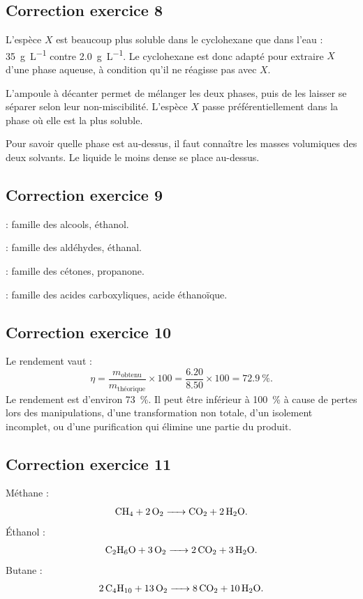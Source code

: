 \documentclass[11pt,a4paper]{article}
\begin{document}
\subsection*{Correction exercice 8}
\begin{correctionbox}
L'espèce $X$ est beaucoup plus soluble dans le cyclohexane que dans l'eau : \SI{35}{g.L^{-1}} contre \SI{2.0}{g.L^{-1}}. Le cyclohexane est donc adapté pour extraire $X$ d'une phase aqueuse, à condition qu'il ne réagisse pas avec $X$.

L'ampoule à décanter permet de mélanger les deux phases, puis de les laisser se séparer selon leur non-miscibilité. L'espèce $X$ passe préférentiellement dans la phase où elle est la plus soluble.

Pour savoir quelle phase est au-dessus, il faut connaître les masses volumiques des deux solvants. Le liquide le moins dense se place au-dessus.
\end{correctionbox}

\subsection*{Correction exercice 9}
\begin{correctionbox}
 : famille des alcools, éthanol.

 : famille des aldéhydes, éthanal.

 : famille des cétones, propanone.

 : famille des acides carboxyliques, acide éthanoïque.
\end{correctionbox}

\subsection*{Correction exercice 10}
\begin{correctionbox}
Le rendement vaut :
\[
\eta=\frac{m_{\text{obtenu}}}{m_{\text{théorique}}}\times100
=\frac{6.20}{8.50}\times100=\SI{72.9}{\percent}.
\]
Le rendement est d'environ \SI{73}{\percent}. Il peut être inférieur à \SI{100}{\percent} à cause de pertes lors des manipulations, d'une transformation non totale, d'un isolement incomplet, ou d'une purification qui élimine une partie du produit.
\end{correctionbox}

\subsection*{Correction exercice 11}
\begin{correctionbox}
Méthane :
\[
\ce{CH4 + 2O2 -> CO2 + 2H2O}.
\]
Éthanol :
\[
\ce{C2H6O + 3O2 -> 2CO2 + 3H2O}.
\]
Butane :
\[
\ce{2C4H10 + 13O2 -> 8CO2 + 10H2O}.
\]
\end{correctionbox}
\end{document}

